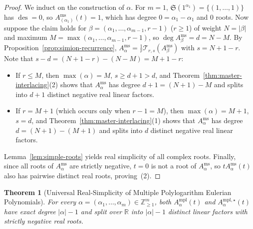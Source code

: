 \documentclass[11pt]{article}
\newtheorem{theorem}{Theorem}[section]
\theoremstyle{definition}
\newcommand{\RR}{\mathbb{R}}
\newcommand{\ZZ}{\mathbb{Z}}
\newcommand{\des}{\operatorname{des}}
\begin{document}
\begin{proof}
We induct on the construction of $\alpha$. For $m=1$, $\mathfrak{S}(1^{\alpha_1}) =
\{(1,\dots,1)\}$ has $\des = 0$, so $A_{(\alpha_1)}^{\mathrm{ms}}(t) = 1$, which has degree
$0 = \alpha_1 - \alpha_1$ and $0$ roots. Now suppose the claim holds for
$\beta = (\alpha_1,\dots,\alpha_{m-1}, r-1)$ ($r \ge 1$) of weight $N = |\beta|$ and maximum
$M = \max(\alpha_1,\dots,\alpha_{m-1}, r-1)$, so $\deg A_\beta^{\mathrm{ms}} = d = N - M$.
By Proposition~\ref{prop:simion-recurrence}, $A_\alpha^{\mathrm{ms}} =
\frac{1}{r}\mathcal{T}_{r,s}(A_\beta^{\mathrm{ms}})$ with $s = N + 1 - r$. Note that
$s - d = (N + 1 - r) - (N - M) = M + 1 - r$:
\begin{itemize}
  \item If $r \le M$, then $\max(\alpha) = M$, $s \ge d + 1 > d$, and
  Theorem~\ref{thm:master-interlacing}(2) shows that $A_\alpha^{\mathrm{ms}}$ has degree
  $d + 1 = (N+1) - M$ and splits into $d+1$ distinct negative real linear factors.
  \item If $r = M + 1$ (which occurs only when $r - 1 = M$), then $\max(\alpha) = M + 1$,
  $s = d$, and Theorem~\ref{thm:master-interlacing}(1) shows that $A_\alpha^{\mathrm{ms}}$
  has degree $d = (N+1) - (M+1)$ and splits into $d$ distinct negative real linear factors.
\end{itemize}
Lemma~\ref{lem:simple-roots} yields real simplicity of all complex roots. Finally, since all
roots of $A_\alpha^{\mathrm{ms}}$ are strictly negative, $t=0$ is not a root of
$A_\alpha^{\mathrm{ms}}$, so $t A_\alpha^{\mathrm{ms}}(t)$ also has pairwise distinct real
roots, proving~(2).
\end{proof}

\begin{theorem}[Universal Real-Simplicity of Multiple Polylogarithm Eulerian Polynomials]\label{thm:universal-mpl}
For \emph{every} $\alpha = (\alpha_1,\dots,\alpha_m) \in \ZZ_{\ge 1}^m$, both
$A_\alpha^{\mathrm{mpl}}(t)$ and $A_\alpha^{\mathrm{mpl},\star}(t)$ have exact degree
$|\alpha| - 1$ and split over $\RR$ into $|\alpha| - 1$ distinct linear factors with strictly
negative real roots.
\end{theorem}
\end{document}
